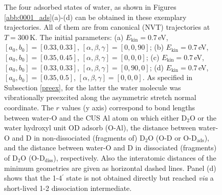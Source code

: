 \documentclass[11pt,DIV=13,BCOR=5mm,a4paper,headinclude]{scrbook}
\begin{document}
\begin{figure}[h!]
\caption{The four adsorbed states of water, as shown in Figures \ref{abb:0001_ads}(a)-(d) can be obtained in these exemplary trajectories.
All of them are from canonical (NVT) trajectories at  $T=300\,$K.
The initial parameters: (a) $E_\textrm{kin}=0.7\,$eV, $[a_0,b_0]=[0.33,0.33]$, $[\alpha,\beta,\gamma]=[0,0,90]$;
 (b) $E_\textrm{kin}=0.7\,$eV, $[a_0,b_0]=[0.35,0.45]$, $[\alpha,\beta,\gamma]=[0,0,0]$;
 (c) $E_\textrm{kin}=0.7\,$eV, $[a_0,b_0]=[0.33,0.33]$, $[\alpha,\beta,\gamma]=[0,90,0]$;
 (d) $E_\textrm{kin}=0.7\,$eV, $[a_0,b_0]=[0.35,0.5]$, $[\alpha,\beta,\gamma]=[0,0,0]$.
As specified in Subsection \ref{preex}, for the latter the water molecule was vibrationally preexcited along the asymmetric stretch normal coordinate.
The $r$ values (y axis) correspond to bond lengths between water-O and the CUS Al atom on which either D$_2$O or the water hydroxyl unit OD adsorb (O-Al), the distance between water-O and D in non-dissociated (fragments of) D$_2$O (O-D or O-D$_\textrm{ads}$), and the  distance between water-O and D in dissociated (fragments) of D$_2$O (O-D$_\textrm{diss}$), respectively.
Also the interatomic distances of the minimum geometries are given as horizontal dashed lines.
Panel (d) shows that the 1-4$^\prime$ state is not obtained directly but reached \textit{via} a short-lived 1-2 dissociation intermediate.}
\label{abb:ex_traj}
\end{figure}
\end{document}
